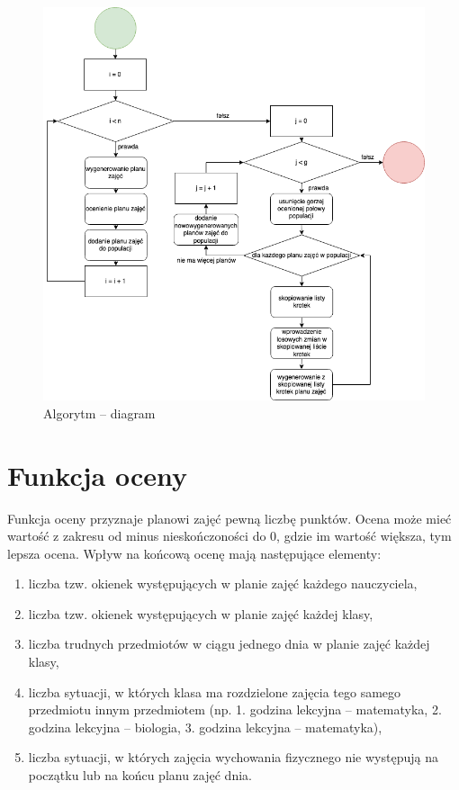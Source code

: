 \begin{figure}[!ht]
\centering\includegraphics[width=\textwidth]{figures/alg_flow}
\caption{Algorytm -- diagram}\label{rys:alf_flow}
\end{figure}

\section{Funkcja oceny}

    Funkcja oceny przyznaje planowi zajęć pewną liczbę punktów. Ocena może mieć wartość z zakresu od minus nieskończoności do 0, gdzie im wartość większa, tym lepsza ocena.
    Wpływ na końcową ocenę mają następujące elementy:
\begin{enumerate}
	\item liczba tzw. okienek występujących w planie zajęć każdego nauczyciela,
	\item liczba tzw. okienek występujących w planie zajęć każdej klasy,
	\item liczba trudnych przedmiotów w ciągu jednego dnia w planie zajęć każdej klasy,
	\item liczba sytuacji, w których klasa ma rozdzielone zajęcia tego samego przedmiotu innym przedmiotem (np. 1. godzina lekcyjna -- matematyka, 2. godzina lekcyjna -- biologia, 3. godzina lekcyjna -- matematyka),
	\item liczba sytuacji, w których zajęcia wychowania fizycznego nie występują na początku lub na końcu planu zajęć dnia.
\end{enumerate}



